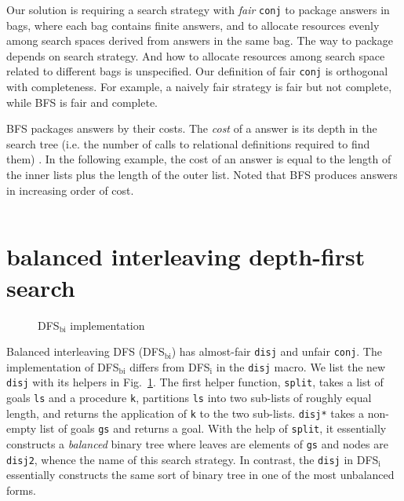 \documentclass[format=acmlarge, review=true, authordraft=true]{acmart}
\newcommand{\conj}{\texttt{conj}}
\newcommand{\disj}{\texttt{disj}}
\begin{document}
Our solution is requiring a search strategy with \emph{fair} \conj{} to 
package answers in bags, where each bag contains finite answers, and to allocate 
resources evenly among search spaces derived from answers in the same bag. The 
way to package depends on search strategy. And how to allocate resources among 
search space related to different bags is unspecified. Our definition of fair 
\conj{} is orthogonal with completeness. For example, a naively fair strategy 
is fair but not complete, while BFS is fair and complete. 

BFS packages answers by their costs. The \emph{cost} of a answer is its 
depth in the search tree (i.e. the number of calls to relational definitions 
required to find them) \citep{seres1999algebra}. In the following example, the 
cost of an answer is equal to the length of the inner lists plus the length of 
the outer list. Noted that BFS produces answers in increasing order of cost.

\begin{center}
	\begin{tabular}{c}
		
	\end{tabular}
\end{center}

\section{balanced interleaving depth-first search}

\begin{figure}
	
	\caption{DFS$_\textrm{bi}$ implementation}
	\label{balanced-disj}
\end{figure}

Balanced interleaving DFS (DFS$_\textrm{bi}$) has almost-fair \disj{} and unfair \conj{}. 
The implementation of DFS$_\textrm{bi}$ differs from DFS$_\textrm{i}$ in the \disj{} macro. We list the 
new \disj{} with its helpers in Fig.~\ref{balanced-disj}. The first helper 
function, \texttt{split}, takes a list of goals \texttt{ls} and a procedure 
\texttt{k}, partitions \texttt{ls} into two sub-lists of roughly equal length, 
and returns the application of \texttt{k} to the two sub-lists. \texttt{disj*} 
takes a non-empty list of goals \texttt{gs} and returns a goal. With the help 
of \texttt{split}, it essentially constructs a \emph{balanced} binary tree 
where leaves are elements of \texttt{gs} and nodes are \texttt{disj2}, whence 
the name of this search strategy. In contrast, the \disj{} in DFS$_\textrm{i}$ essentially 
constructs the same sort of binary tree in one of the most unbalanced forms.
\end{document}

